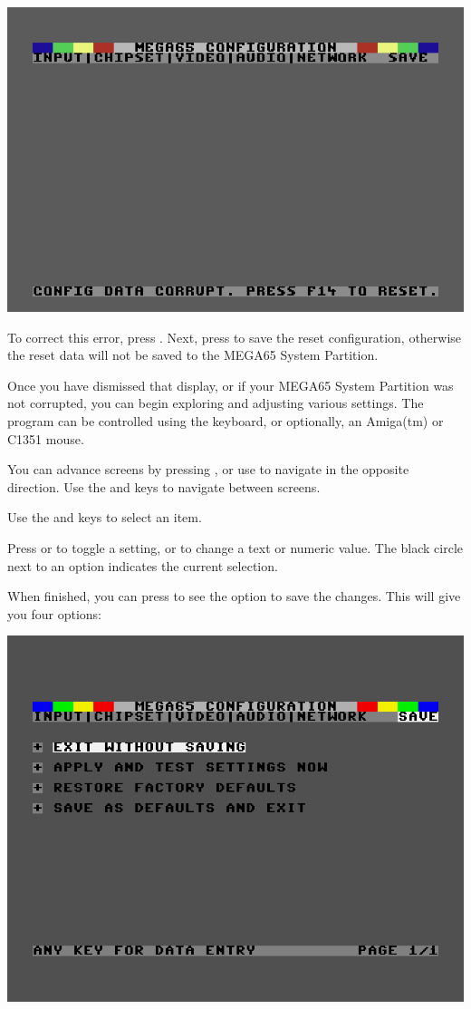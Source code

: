 \begin{center}
  \includegraphics[width=0.7\linewidth]{images/ss-m65config-corrupt.png}
\end{center}

To correct this error, press . Next, press  to save the reset configuration, otherwise the reset data will not be saved to the MEGA65 System
Partition.

Once you have dismissed that display, or if your MEGA65 System Partition was not corrupted, you can begin exploring and adjusting various settings. The program can be controlled using the keyboard, or optionally, an Amiga(tm) or C1351 mouse.

You can advance screens by pressing , or use  to navigate in the opposite direction. Use the \megakey{$\leftarrow$} and \megakey{$\rightarrow$} keys to navigate between screens.

Use the \megakey{$\uparrow$} and \megakey{$\downarrow$} keys to select an item.

Press  or  to toggle a setting, or to change a text or numeric value. The black circle next to an option indicates the current selection.

  When finished, you can press  to see the
  option to save the changes. This will give you four options:

\begin{center}
  \includegraphics[width=0.7\linewidth]{images/ss-m65config-save.png}
\end{center}

